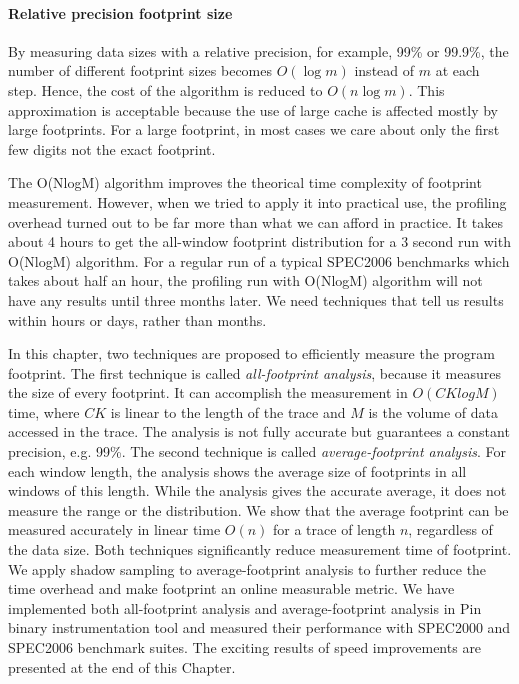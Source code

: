\paragraph{Relative precision footprint size} By measuring data sizes
with a relative precision, for example, 99\% or 99.9\%, the number of
different footprint sizes becomes $O(\log m)$ instead of $m$ at each
step. Hence, the cost of the algorithm is reduced to $O(n\log m)$. This
approximation is acceptable because the use of large cache is affected
mostly by large footprints. For a large footprint, in most cases we
care about only the first few digits not the exact footprint.

The O(NlogM) algorithm improves the theorical time complexity of
footprint measurement. However, when we tried to apply it into
practical use, the profiling overhead turned out to be far more than
what we can afford in practice. It takes about 4 hours to get the
all-window footprint distribution for a 3 second run with O(NlogM)
algorithm. For a regular run of a typical SPEC2006 benchmarks which
takes about half an hour, the profiling run with O(NlogM) algorithm
will not have any results until three months later. We need techniques
that tell us results within hours or days, rather than months.

In this chapter, two techniques are proposed to efficiently measure
the program footprint. The first technique is called
\emph{all-footprint analysis}, because it measures the size of every
footprint. It can accomplish the measurement in $O(CKlogM)$ time,
where $CK$ is linear to the length of the trace and $M$ is the volume
of data accessed in the trace. The analysis is not fully accurate but
guarantees a constant precision, e.g. 99\%. The second technique is
called {\em average-footprint analysis}. For each window length, the
analysis shows the average size of footprints in all windows of this
length.  While the analysis gives the accurate average, it does not
measure the range or the distribution. We show that the average
footprint can be measured accurately in linear time $O(n)$ for a trace
of length $n$, regardless of the data size. Both techniques
significantly reduce measurement time of footprint. We apply shadow
sampling to average-footprint analysis to further reduce the time
overhead and make footprint an online measurable metric. We have
implemented both all-footprint analysis and average-footprint analysis
in Pin binary instrumentation tool and measured their performance with
SPEC2000 and SPEC2006 benchmark suites. The exciting results of speed
improvements are presented at the end of this Chapter.


